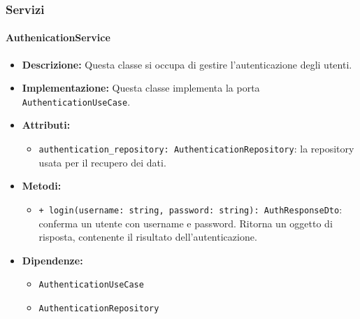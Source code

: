 \subsubsection{Servizi}

\paragraph{AuthenicationService} \label{AuthenticationService}
\begin{itemize}
    \item \textbf{Descrizione:} Questa classe si occupa di gestire l'autenticazione degli utenti.
    \item \textbf{Implementazione:} Questa classe implementa la porta \texttt{AuthenticationUseCase}.
    \item \textbf{Attributi:}
    \begin{itemize}
        \item \texttt{authentication\_repository: AuthenticationRepository}: la repository usata per il recupero dei dati.
    \end{itemize}
    \item \textbf{Metodi:}
    \begin{itemize}
        \item \texttt{+ login(username: string, password: string): AuthResponseDto}: conferma un utente con username e password. Ritorna un oggetto di risposta, contenente il risultato dell'autenticazione.
    \end{itemize}
    \item \textbf{Dipendenze:}
    \begin{itemize}
        \item \texttt{AuthenticationUseCase}
        \item \texttt{AuthenticationRepository}
    \end{itemize}
\end{itemize}  

